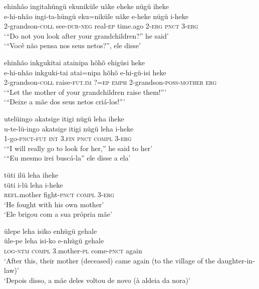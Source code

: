 \documentclass[output=paper,
modfonts,nonflat
]{langsci/langscibook}
\begin{document}
\ea ehinhão ingitahüngü ekuniküle uãke eheke nügü iheke \\
\gll e-hi-nhão ingi-ta-hüngü eku=niküle uãke e-heke nügü i-heke \\
2-grandson-\textsc{coll} see\textsc{-dur-neg} real\textsc{-ep} time.ago 2\textsc{-erg} \textsc{pnct} \textsc{3-erg} \\
\glt ‘“Do not you look after your grandchildren?” he said’ \\
‘“Você não pensa nos seus netos?”, ele disse’ \\
\z

\ea ehinhão inkgukitai atainipa hõhõ ehigüsi heke \\[.3em]
\gll e-hi-nhão inkguki-tai atai=nipa hõhõ e-hi-gü-isi heke \\
2-grandson-\textsc{coll} raise\textsc{-fut.im} ?=\textsc{ep} \textsc{emph} 2-grandson\textsc{-poss-mother} \textsc{erg} \\
\glt ‘“Let the mother of your grandchildren raise them!”’ \\
‘“Deixe a mãe dos seus netos criá-los!”’ \\
\z

\ea utelüingo akatsige itigi nügü leha iheke \\[.3em]
\gll u-te-lü-ingo akatsige itigi nügü leha i-heke \\
1-go-\textsc{pnct-fut} \textsc{int} \textsc{3.fin} \textsc{pnct} \textsc{compl} \textsc{3-erg} \\
\glt ‘“I will really go to look for her,” he said to her’ \\
‘“Eu mesmo irei buscá-la” ele disse a ela’ \\
\z

\ea tüti ilü leha iheke \\[.3em]
\gll  tüti i-lü leha i-heke \\
\textsc{refl.}mother fight-\textsc{pnct} \textsc{compl} \textsc{3-erg} \\
\glt ‘He fought with his own mother’ \\
‘Ele brigou com a sua própria mãe’ \\
\z

\ea ülepe leha isiko enhügü gehale \\[.3em]
\gll üle-pe leha isi-ko e-nhügü gehale \\
\textsc{log-ntm} \textsc{compl} 3.mother-\textsc{pl} come\textsc{-pnct} again \\
\glt ‘After this, their mother (deceased) came again (to the village of the daughter-in-law)’ \\
‘Depois disso, a mãe deles voltou de novo (à aldeia da nora)’ \\
\z
\end{document}
